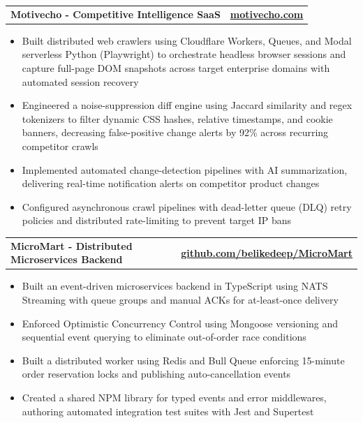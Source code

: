 \documentclass[a4paper,10pt]{article}
\makeatletter
\newcommand{\resumeItemHeader}[2]{%
  \vspace{1pt}%
  \noindent%
  \begin{tabular*}{\textwidth}{@{}l@{\extracolsep{\fill}}r@{}}
    \textbf{\fontsize{9pt}{10.5pt}\selectfont #1} & \textbf{\fontsize{9pt}{10.5pt}\selectfont #2} \\
  \end{tabular*}\par\vspace{0pt}%
}
\makeatother
\begin{document}
\vspace{0.5pt}

\resumeItemHeader{Motivecho - Competitive Intelligence SaaS}{\href{https://motivecho.com}{\underline{motivecho.com}}}
\begin{itemize}
    \item Built distributed web crawlers using Cloudflare Workers, Queues, and Modal serverless Python (Playwright) to orchestrate headless browser sessions and capture full-page DOM snapshots across target enterprise domains with automated session recovery
    \item Engineered a noise-suppression diff engine using Jaccard similarity and regex tokenizers to filter dynamic CSS hashes, relative timestamps, and cookie banners, decreasing false-positive change alerts by 92\% across recurring competitor crawls
    \item Implemented automated change-detection pipelines with AI summarization, delivering real-time notification alerts on competitor product changes
    \item Configured asynchronous crawl pipelines with dead-letter queue (DLQ) retry policies and distributed rate-limiting to prevent target IP bans
\end{itemize}

\vspace{0.5pt}

\resumeItemHeader{MicroMart - Distributed Microservices Backend}{\href{https://github.com/belikedeep/MicroMart}{\underline{github.com/belikedeep/MicroMart}}}
\begin{itemize}
    \item Built an event-driven microservices backend in TypeScript using NATS Streaming with queue groups and manual ACKs for at-least-once delivery
    \item Enforced Optimistic Concurrency Control using Mongoose versioning and sequential event querying to eliminate out-of-order race conditions
    \item Built a distributed worker using Redis and Bull Queue enforcing 15-minute order reservation locks and publishing auto-cancellation events
    \item Created a shared NPM library for typed events and error middlewares, authoring automated integration test suites with Jest and Supertest
\end{itemize}

\vspace{0.5pt}
\end{document}
